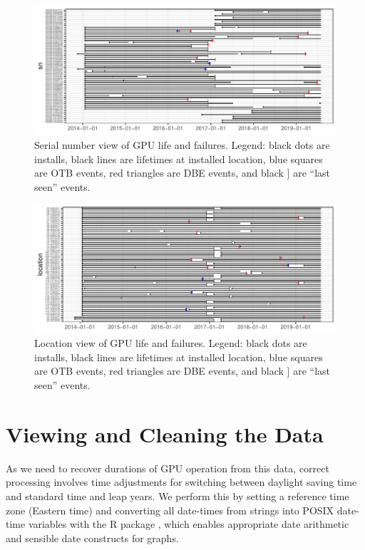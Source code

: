 \begin{figure}[bt]
  \includegraphics[width=6.5in]{figs/sample_sn.pdf}
  \caption{Serial number view of GPU life and failures. Legend: black
    dots are installs, black lines are lifetimes at installed
    location, blue squares are OTB events, red triangles are DBE
    events, and black ] are ``last seen'' events.}
  \label{fig:gpuview}
\end{figure}
\begin{figure}[tb]
  \includegraphics[width=6.5in]{figs/sample_loc.pdf}
  \caption{Location view of GPU life and failures.  Legend: black dots
    are installs, black lines are lifetimes at installed location,
    blue squares are OTB events, red triangles are DBE events, and
    black ] are ``last seen'' events.}
  \label{fig:locview}
\end{figure}
\section{Viewing and Cleaning the Data}
\label{section:dataclean}
As we need to recover durations of GPU operation from this data, correct
processing involves time adjustments for switching between daylight
saving time and standard time and leap years. We perform this by
setting a reference time zone (Eastern time) and converting all
date-times from strings into POSIX date-time variables with the R
 package \cite{lubridate}, which enables appropriate
date arithmetic and sensible date constructs for graphs.

